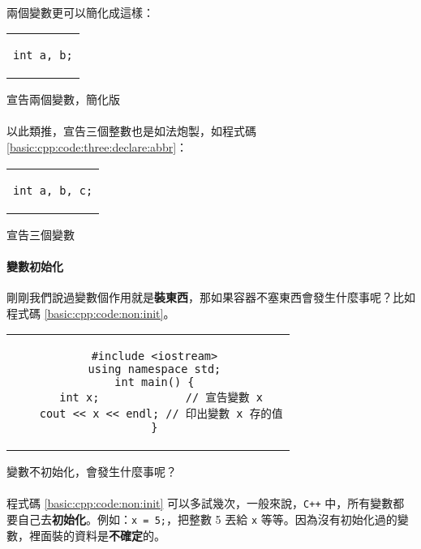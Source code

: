 \documentclass[12pt,a4paper,oneside]{article}
\begin{document}
\begin{CJK}{UTF8}{bkai}
\paragraph{}兩個變數更可以簡化成這樣：
\begin{code}[h!]
\centering
\begin{tabular}{c}
\begin{lstlisting}
int a, b;
\end{lstlisting}
\end{tabular}
\caption{宣告兩個變數，簡化版}
\label{basic:cpp:code:two:declare:abbr}
\end{code}

\paragraph{}以此類推，宣告三個整數也是如法炮製，如程式碼 \ref{basic:cpp:code:three:declare:abbr}：
\begin{code}[h!]
\centering
\begin{tabular}{c}
\begin{lstlisting}
int a, b, c;
\end{lstlisting}
\end{tabular}
\caption{宣告三個變數}
\label{basic:cpp:code:three:declare:abbr}
\end{code}

\paragraph{變數初始化}剛剛我們說過變數個作用就是\textbf{裝東西}，那如果容器不塞東西會發生什麼事呢？比如程式碼 \ref{basic:cpp:code:non:init}。

\begin{code}[h!]
\centering
\begin{tabular}{c}
\begin{lstlisting}
  #include <iostream>
  using namespace std;
  int main() {
    int x;             // 宣告變數 x
    cout << x << endl; // 印出變數 x 存的值
  }
\end{lstlisting}
\end{tabular}
\caption{變數不初始化，會發生什麼事呢？}
\label{basic:cpp:code:non:init}
\end{code}

\paragraph{}程式碼 \ref{basic:cpp:code:non:init} 可以多試幾次，一般來說，\texttt{C++} 中，所有變數都要自己去\textbf{初始化}。例如：\lstinline!x = 5;!，把整數 5 丟給 \lstinline!x! 等等。因為沒有初始化過的變數，裡面裝的資料是\textbf{不確定}的。


\end{CJK}
\end{document}
